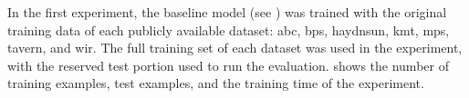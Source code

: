 
In the first experiment, the baseline model (see
) was trained with the original
training data of each publicly available dataset: \gls{abc},
\gls{bps}, \gls{haydnsun}, \gls{kmt}, \gls{mps},
\gls{tavern}, and \gls{wir}. The full training set of each
dataset was used in the experiment, with the reserved test
portion used to run the evaluation.
 shows the number of training
examples, test examples, and the training time of the
experiment. 

